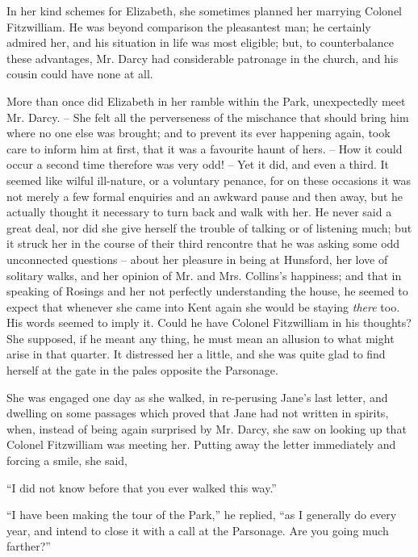 In her kind schemes for Elizabeth, she sometimes
plann\-ed her marrying Colonel Fitzwilliam. He was beyond
comparison the pleasantest man; he certainly admired
her, and his situation in life was most eligible; but, to
counterbalance these advantages, Mr. Darcy had considerable
patronage in the church, and his cousin could
have none at all.


More than once did Elizabeth in her ramble within
the Park, unexpectedly meet Mr. Darcy. -- She felt all the
perverseness of the mischance that should bring him where
no one else was brought; and to prevent its ever happening
again, took care to inform him at first, that it was a
favourite haunt of hers. -- How it could occur a second
time therefore was very odd! -- Yet it did, and even a third.
It seemed like wilful ill-nature, or a voluntary penance,
for on these occasions it was not merely a few formal
enquiries and an awkward pause and then away, but he
actually thought it necessary to turn back and walk with
her. He never said a great deal, nor did she give herself
the trouble of talking or of listening much; but it struck
her in the course of their third rencontre that he was
asking some odd unconnected questions -- about her
pleasure in being at Hunsford, her love of solitary walks,
and her opinion of Mr. and Mrs. Collins’s happiness;
and that in speaking of Rosings and her not perfectly
understanding the house, he seemed to expect that whenever
she came into Kent again she would be staying \textit{there}
too. His words seemed to imply it. Could he have
Colonel Fitzwilliam in his thoughts? She supposed, if he
meant any thing, he must mean an allusion to what might
arise in that quarter. It distressed her a little, and she
was quite glad to find herself at the gate in the pales
opposite the Parsonage.

She was engaged one day as she walked, in re-perusing
Jane’s last letter, and dwelling on some passages which
proved that Jane had not written in spirits, when, instead
of being again surprised by Mr. Darcy, she saw on looking
up that Colonel Fitzwilliam was meeting her. Putting
away the letter immediately and forcing a smile, she said,

“I did not know before that you ever walked this way.”

“I have been making the tour of the Park,” he replied,
“as I generally do every year, and intend to close it with
a call at the Parsonage. Are you going much farther?”

